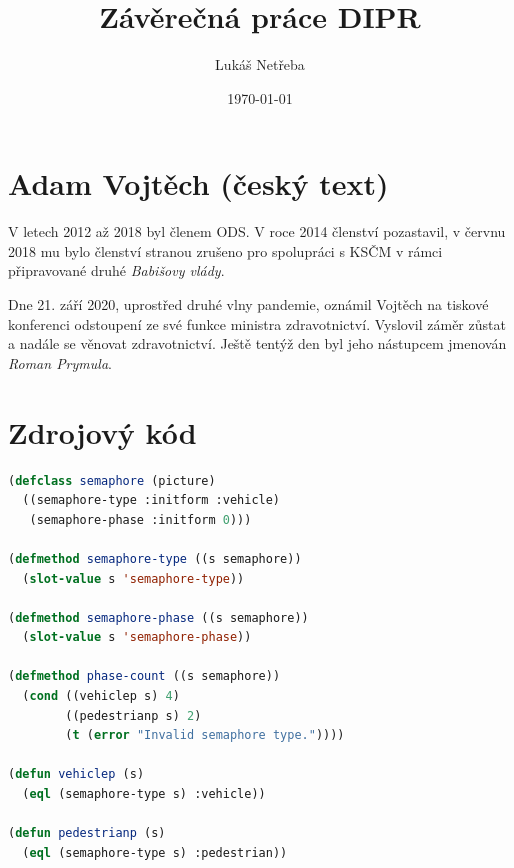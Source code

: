 \documentclass[a4paper, 12pt]{article}
\title{\bf Závěrečná práce DIPR}
\author{Lukáš Netřeba}
\date{\today}
\begin{document}
\maketitle
\newpage
\tableofcontents
\newpage

\section{Adam Vojtěch (český text)}
\label{text} %


V letech 2012 až 2018 byl členem ODS. V roce 2014 členství pozastavil, v červnu 2018 mu bylo členství stranou zrušeno pro spolupráci s KSČM v rámci připravované druhé {\it Babišovy vlády}.



Dne 21. září 2020, uprostřed druhé vlny pandemie, oznámil Vojtěch na tiskové konferenci odstoupení ze své funkce ministra zdravotnictví. Vyslovil záměr zůstat  a nadále se věnovat zdravotnictví. Ještě tentýž den byl jeho nástupcem jmenován {\it Roman Prymula}.

\newpage
\section{Zdrojový kód} 
\label{sourcecode} %


\begin{lstlisting}[language=Lisp] 
(defclass semaphore (picture)
  ((semaphore-type :initform :vehicle)
   (semaphore-phase :initform 0)))

(defmethod semaphore-type ((s semaphore))
  (slot-value s 'semaphore-type))

(defmethod semaphore-phase ((s semaphore))
  (slot-value s 'semaphore-phase))

(defmethod phase-count ((s semaphore))
  (cond ((vehiclep s) 4)
        ((pedestrianp s) 2)
        (t (error "Invalid semaphore type."))))

(defun vehiclep (s)
  (eql (semaphore-type s) :vehicle))

(defun pedestrianp (s)
  (eql (semaphore-type s) :pedestrian))
\end{lstlisting}
\end{document}
